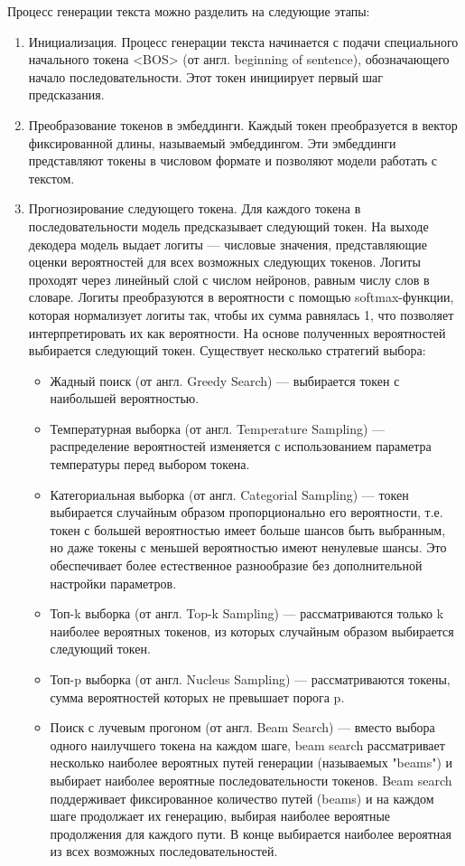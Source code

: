 \documentclass[a4paper,12pt]{extarticle}
\begin{document}
Процесс генерации текста можно разделить на следующие этапы:
\begin{enumerate}[label=\arabic*.]
	\item Инициализация. Процесс генерации текста начинается с подачи специального начального токена <BOS> (от англ. beginning of sentence), обозначающего начало последовательности. Этот токен инициирует первый шаг предсказания.
	\item Преобразование токенов в эмбеддинги. Каждый токен преобразуется в вектор фиксированной длины, называемый эмбеддингом. Эти эмбеддинги представляют токены в числовом формате и позволяют модели работать с текстом.
	\item Прогнозирование следующего токена. Для каждого токена в последовательности модель предсказывает следующий токен. На выходе декодера модель выдает логиты — числовые значения, представляющие оценки вероятностей для всех возможных следующих токенов. Логиты проходят через линейный слой с числом нейронов, равным числу слов в словаре. Логиты преобразуются в вероятности с помощью softmax-функции, которая нормализует логиты так, чтобы их сумма равнялась 1, что позволяет интерпретировать их как вероятности. На основе полученных вероятностей выбирается следующий токен. Существует несколько стратегий выбора:
	\begin{itemize}
		\item Жадный поиск (от англ. Greedy Search) — выбирается токен с наибольшей вероятностью.
		\item Температурная выборка (от англ. Temperature Sampling) — распределение вероятностей изменяется с использованием параметра температуры перед выбором токена.
		\item Категориальная выборка (от англ. Categorial Sampling) — токен выбирается случайным образом пропорционально его вероятности, т.е. токен с большей вероятностью имеет больше шансов быть выбранным, но даже токены с меньшей вероятностью имеют ненулевые шансы. Это обеспечивает более естественное разнообразие без дополнительной настройки параметров.
		\item Топ-k выборка (от англ. Top-k Sampling) — рассматриваются только k наиболее вероятных токенов, из которых случайным образом выбирается следующий токен.
		\item Топ-p выборка (от англ. Nucleus Sampling) — рассматриваются токены, сумма вероятностей которых не превышает порога p.
		\item Поиск с лучевым прогоном (от англ. Beam Search) — вместо выбора одного наилучшего токена на каждом шаге, beam search рассматривает несколько наиболее вероятных путей генерации (называемых "beams") и выбирает наиболее вероятные последовательности токенов. Beam search поддерживает фиксированное количество путей (beams) и на каждом шаге продолжает их генерацию, выбирая наиболее вероятные продолжения для каждого пути. В конце выбирается наиболее вероятная из всех возможных последовательностей.

\end{itemize}
\end{enumerate}
\end{document}
